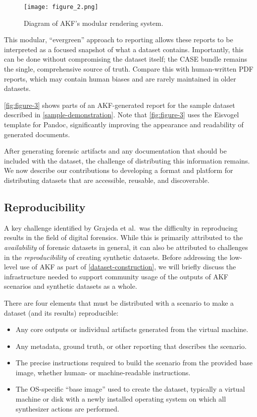 \documentclass[preprint,12pt]{elsarticle}
\begin{document}
\begin{figure*}[htbp]
\centering
\texttt{[image: figure\_2.png]}
\caption{Diagram of AKF's modular rendering system.}\label{fig:figure-2}
\end{figure*}

This modular, ``evergreen'' approach to reporting allows these reports
to be interpreted as a focused snapshot of what a dataset contains.
Importantly, this can be done without compromising the dataset itself;
the CASE bundle remains the single, comprehensive source of truth.
Compare this with human-written PDF reports, which may contain human
biases and are rarely maintained in older datasets.

\autoref{fig:figure-3} shows parts of an AKF-generated report for the
sample dataset described in \autoref{sample-demonstration}. Note that
\autoref{fig:figure-3} uses the Eisvogel template
\citep{waglerWandmalfarbePandoclatextemplate2025} for Pandoc,
significantly improving the appearance and readability of generated
documents.

After generating forensic artifacts and any documentation that should be
included with the dataset, the challenge of distributing this
information remains. We now describe our contributions to developing a
format and platform for distributing datasets that are accessible,
reusable, and discoverable.

\subsection{Reproducibility}\label{reproducibility}

A key challenge identified by Grajeda et al.~was the difficulty in
reproducing results in the field of digital forensics. While this is
primarily attributed to the \emph{availability} of forensic datasets in
general, it can also be attributed to challenges in the
\emph{reproducibility} of creating synthetic datasets. Before addressing
the low-level use of AKF as part of \autoref{dataset-construction}, we
will briefly discuss the infrastructure needed to support community
usage of the outputs of AKF scenarios and synthetic datasets as a whole.

There are four elements that must be distributed with a scenario to make
a dataset (and its results) reproducible:

\begin{itemize}
\item
  Any core outputs or individual artifacts generated from the virtual
  machine.
\item
  Any metadata, ground truth, or other reporting that describes the
  scenario.
\item
  The precise instructions required to build the scenario from the
  provided base image, whether human- or machine-readable instructions.
\item
  The OS-specific ``base image'' used to create the dataset, typically a
  virtual machine or disk with a newly installed operating system on
  which all synthesizer actions are performed.
\end{itemize}
\end{document}
